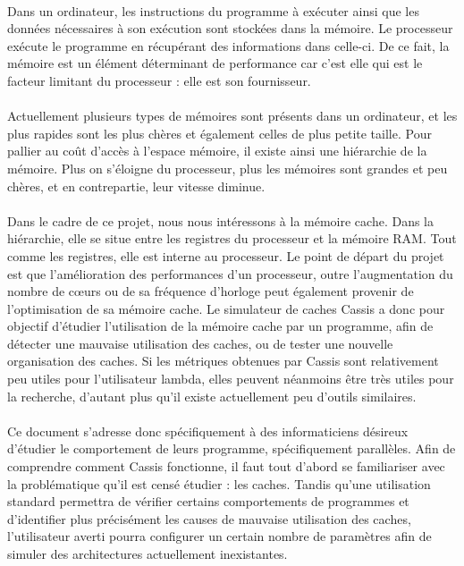 \paragraph{}
Dans un ordinateur, les instructions du programme à exécuter ainsi que les données nécessaires
à son exécution sont stockées dans la mémoire. Le processeur exécute le programme en récupérant des informations dans celle-ci. De ce fait, la mémoire est un élément déterminant de performance car c'est elle qui est le facteur limitant du processeur : elle est son fournisseur.

\paragraph{}
Actuellement plusieurs types de mémoires sont présents dans un ordinateur, et les plus rapides sont les plus chères et également celles de plus petite taille.
Pour pallier au coût d'accès à l'espace mémoire, il existe ainsi une hiérarchie de la mémoire. Plus on s'éloigne du processeur, plus les mémoires sont grandes et peu chères, et en contrepartie, leur vitesse diminue. 

\paragraph{}
Dans le cadre de ce projet, nous nous intéressons à la mémoire cache. Dans la hiérarchie, elle se situe entre les registres du processeur et la mémoire RAM. Tout comme les registres, elle est interne au processeur.
Le point de départ du projet est que l'amélioration des performances d'un processeur, outre l'augmentation du nombre de c{\oe}urs ou de sa fréquence d'horloge peut également provenir de l'optimisation de sa mémoire cache. Le simulateur de caches \textsf{Cassis} a donc pour objectif d'étudier l'utilisation de la mémoire cache par un programme, afin de détecter une mauvaise utilisation des caches, ou de tester une nouvelle organisation des caches. Si les métriques obtenues par \textsf{Cassis} sont relativement peu utiles pour l'utilisateur lambda, elles peuvent néanmoins être très utiles pour la recherche, d'autant plus qu'il existe actuellement peu d'outils similaires.

\paragraph{}
Ce document s'adresse donc spécifiquement à des informaticiens désireux d'étudier le comportement de leurs programme, spécifiquement parallèles. Afin de comprendre comment \textsf{Cassis} fonctionne, il faut tout d'abord se familiariser avec la problématique qu'il est censé étudier : les caches. Tandis qu'une utilisation standard permettra de vérifier certains comportements de programmes et d'identifier plus précisément les causes de mauvaise utilisation des caches, l'utilisateur averti pourra configurer un certain nombre de paramètres afin de simuler des architectures actuellement inexistantes.
